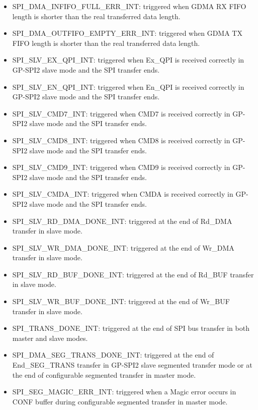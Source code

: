 \documentclass[main\_\_EN.tex]{subfiles}
\begin{document}
\begin{itemize}
\item \label{int:SPIINFIFOFULLERRINT}SPI\_DMA\_INFIFO\_FULL\_ERR\_INT: triggered when GDMA RX FIFO length is shorter than the real transferred data length.
\item \label{int:SPIOUTFIFOEMPTYERRINT}SPI\_DMA\_OUTFIFO\_EMPTY\_ERR\_INT: triggered when GDMA TX FIFO length is shorter than the real transferred data length.

\item \label{int:SPISLVEXQPIINT} SPI\_SLV\_EX\_QPI\_INT: triggered when Ex\_QPI is received correctly in GP-SPI2 slave mode and the SPI transfer ends.
\item \label{int:SPISLVENQPIINT} SPI\_SLV\_EN\_QPI\_INT: triggered when En\_QPI is received correctly in GP-SPI2 slave mode and the SPI transfer ends.
\item \label{int:SPISLVCMD7INT} SPI\_SLV\_CMD7\_INT: triggered when CMD7 is received correctly in GP-SPI2 slave mode and the SPI transfer ends.
\item \label{int:SPISLVCMD8INT} SPI\_SLV\_CMD8\_INT: triggered when CMD8 is received correctly in GP-SPI2 slave mode and the SPI transfer ends.
\item \label{int:SPISLVCMD9INT} SPI\_SLV\_CMD9\_INT: triggered when CMD9 is received correctly in GP-SPI2 slave mode and the SPI transfer ends.
\item \label{int:SPISLVCMDAINT} SPI\_SLV\_CMDA\_INT: triggered when CMDA is received correctly in GP-SPI2 slave mode and the SPI transfer ends.

\item \label{int:SPISLVRDDMADONEINT}SPI\_SLV\_RD\_DMA\_DONE\_INT: triggered at the end of Rd\_DMA transfer in slave mode.
\item \label{int:SPISLVWRDMADONEINT}SPI\_SLV\_WR\_DMA\_DONE\_INT: triggered at the end of Wr\_DMA transfer in slave mode.
\item \label{int:SPISLVRDBUFDONEINT}SPI\_SLV\_RD\_BUF\_DONE\_INT: triggered at the end of Rd\_BUF transfer in slave mode.
\item \label{int:SPISLVWRBUFDONEINT}SPI\_SLV\_WR\_BUF\_DONE\_INT: triggered at the end of Wr\_BUF transfer in slave mode.

\item \label{int:SPITRANSDONEINT}SPI\_TRANS\_DONE\_INT: triggered at the end of SPI bus transfer in both master and slave modes.
\item \label{int:SPIDMASEGTRANSDONEINT}SPI\_DMA\_SEG\_TRANS\_DONE\_INT: triggered at the end of End\_SEG\_TRANS transfer in GP-SPI2 slave segmented transfer mode or at the end of configurable segmented transfer in master mode.
\item \label{int:SPISEGMAGICERRINT} SPI\_SEG\_MAGIC\_ERR\_INT: triggered when a Magic error occurs in CONF buffer during configurable segmented transfer in master mode.



\end{itemize}
\end{document}
